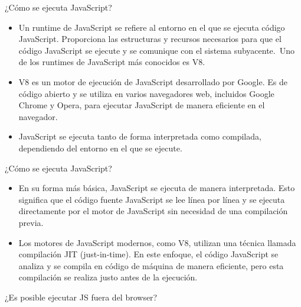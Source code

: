 \documentclass[aspectratio=43,10pt,t]{beamer}
\begin{document}
\begin{frame}{¿Cómo se ejecuta JavaScript?}\relax
\begingroup
{}
\begin{itemize}
  \item Un runtime de JavaScript se refiere al entorno en el que se ejecuta código JavaScript. Proporciona las estructuras y recursos necesarios para que el código JavaScript se ejecute y se comunique con el sistema subyacente.~Uno de los runtimes de JavaScript más conocidos es V8.
  \item V8 es un motor de ejecución de JavaScript desarrollado por Google. Es de código abierto y se utiliza en varios navegadores web, incluidos Google Chrome y Opera, para ejecutar JavaScript de manera eficiente en el navegador.
  \item JavaScript se ejecuta tanto de forma interpretada como compilada, dependiendo del entorno en el que se ejecute.
\end{itemize}
\endgroup
\end{frame}

\begin{frame}{¿Cómo se ejecuta JavaScript?}\relax
\begingroup
{}
\begin{itemize}
  \item En su forma más básica, JavaScript se ejecuta de manera interpretada. Esto significa que el código fuente JavaScript se lee línea por línea y se ejecuta directamente por el motor de JavaScript sin necesidad de una compilación previa. 
  \item Los motores de JavaScript modernos, como V8, utilizan una técnica llamada compilación JIT (just-in-time). En este enfoque, el código JavaScript se analiza y se compila en código de máquina de manera eficiente, pero esta compilación se realiza justo antes de la ejecución.
\end{itemize}
\endgroup
\end{frame}

\begin{frame}{¿Es posible ejecutar JS fuera del browser?}\relax
{}
\end{frame}
\end{document}
